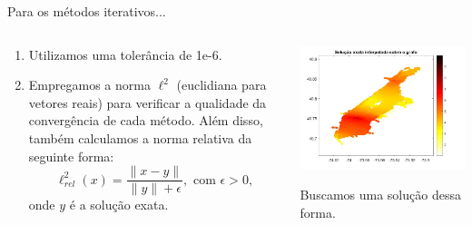 \documentclass{beamer} %
\theoremstyle{definition}
\begin{document}
    \begin{frame}{Para os métodos iterativos...}
        \pause
        \begin{columns}
            \begin{column}{0.5\textwidth}
                \begin{enumerate}
                    \item Utilizamos uma tolerância de 1e-6.
                    \pause
                    \item Empregamos a norma $\ell^2$ (euclidiana para vetores reais) para verificar a qualidade da convergência de cada método. Além disso, também calculamos a norma relativa da seguinte forma:
                    \pause
                        $$\ell^2_{rel}(x) = \frac{\|x - y\|}{\|y\| + \epsilon }, \text{ com } \epsilon > 0,$$
                        onde $y$ é a solução exata.
                \end{enumerate}
            \end{column}
            \begin{column}{0.5\textwidth}
                \pause
                \centering
                \includegraphics[width=\textwidth]{exactsolution.jpeg}
                \pause
                \caption{\scriptsize{Buscamos uma solução dessa forma.}}
            \end{column}
            
        \end{columns}
    \end{frame}
\end{document}
